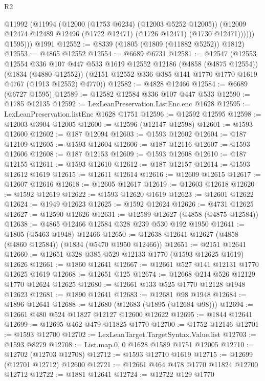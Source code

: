\begin{lexlean}{R2}
\begin{coremodule}
            @11992
              (@11994
                (@12000 (@1753 @6234) (@12003 @5252 @12005))
                (@12009 @12474 @12489 @12496 (@1722 @12471) (@1726 @12471) (@1730 @12471))))))
          @1595)))
    @1991
@12552 := @8339 (@1805 (@1809 (@11882 @5252)) @1812)
@12553 := @4865 @12552
@12554 := @6689 @6731
@12581 := @12547
    (@12553
      @12554
      @336
      @107
      @447
      @533
      @1619
      @12552
      @12186
      (@4858 (@4875 @12554))
      (@1834 (@4880 @12552))
      (@2151 @12552 @336 @385 @141 @1770 @1770 @1619 @4767 (@1913 @12552) @4770))
@12582 := @4828 @12466
@12584 := @6689 (@6727 @1595)
@12589 := @12582 @12584 @336 @107 @447 @533
@12590 := @1785 @12135
@12592 := LexLeanPreservation.ListEnc.enc @1628
@12595 := LexLeanPreservation.listEnc @1628 @1751
@12596 := @12592 @12595
@12598 := @12003 @3904 @12005
@12600 := @12596 (@12147 @12598)
@12601 := @1593 @12600
@12602 := @187 @12094
@12603 := @1593 @12602
@12604 := @187 @12109
@12605 := @1593 @12604
@12606 := @187 @12116
@12607 := @1593 @12606
@12608 := @187 @12153
@12609 := @1593 @12608
@12610 := @187 @12155
@12611 := @1593 @12610
@12612 := @187 @12157
@12614 := @1593 @12612 @1619
@12615 := @12611 @12614
@12616 := @12609 @12615
@12617 := @12607 @12616
@12618 := @12605 @12617
@12619 := @12603 @12618
@12620 := @1592 @12619
@12622 := @1593 @12620 @1619
@12623 := @12601 @12622
@12624 := @1949 @12623
@12625 := @1592 @12624
@12626 := @4731 @12625
@12627 := @12590 @12626
@12631 := @12589 @12627 (@4858 (@4875 @12584))
@12638 := @4865 @12466 @12584 @328 @239 @530 @192 @1950
@12641 := @1805 (@5463 @1948) @12466
@12650 := @12638 @12641 @12627 (@4858 (@4860 @12584)) (@1834 (@5470 @1950 @12466))
@12651 := @2151 @12641
@12660 := @12651 @328 @385 @529 @12133 @1770 (@1593 @12625 @1619) @12626
@12661 := @1860 @12641
@12667 := @12661 @527 @141 @12131 @1770 @12625 @1619
@12668 := @12651 @125
@12674 := @12668 @214 @526 @12129 @1770 @12624 @12625
@12680 := @12661 @133 @525 @1770 @12128 @1948 @12623
@12681 := @1890 @12641
@12683 := @12681 @98 @1948
@12684 := @1896 @12641
@12688 := @12680 (@12683 (@1895 (@12684 @98)))
@12694 := @12661 @480 @524 @11827 @12127 @12600 @12622
@12695 := @1844 @12641
@12699 := @12695 @462 @479 @11825 @1770
@12700 := @1752 @12146
@12701 := @1593 @12700
@12702 := LexLeanTarget.TargetSyntax.Value.list
@12703 := @1593 @8279
@12708 := List.map.{0, 0} @1628 @1589 @1751 @12005
@12710 := @12702 (@12703 @12708)
@12712 := @1593 @12710 @1619
@12715 := @12699 (@12701 @12712) @12600
@12721 := @12661 @464 @478 @1770 @11824 @12700 @12712
@12722 := @1881 @12641
@12724 := @12722 @129 @1770

\end{coremodule}
\end{lexlean}
